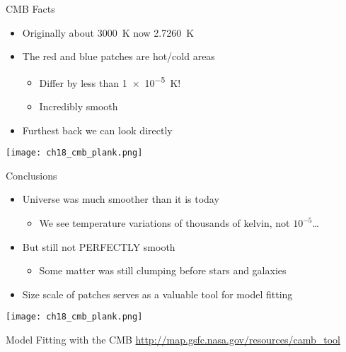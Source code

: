 \documentclass[pdf,aspectratio=169]{beamer}
\begin{document}
\begin{frame}{CMB Facts}
  \begin{itemize}
	\item Originally about \SI{3000}{\kelvin} now \SI{2.7260}{\kelvin}
	\item The red and blue patches are hot/cold areas
	  \begin{itemize}
		\item Differ by less than \SI{1e-5}{\kelvin}!
		\item Incredibly smooth
	  \end{itemize}
	\item Furthest back we can look directly
  \end{itemize}
  \begin{center}
	\texttt{[image: ch18\_cmb\_plank.png]}
  \end{center}
\end{frame}

\begin{frame}{Conclusions}
  \begin{itemize}
	\item Universe was much smoother than it is today
	  \begin{itemize}
		\item We see temperature variations of thousands of kelvin, not $10^{-5}$\ldots
	  \end{itemize}
	\item But still not PERFECTLY smooth
	  \begin{itemize}
		\item Some matter was still clumping before stars and galaxies
	  \end{itemize}
	\item Size scale of patches serves as a valuable tool for model fitting
  \end{itemize}
  \begin{center}
	\texttt{[image: ch18\_cmb\_plank.png]}
  \end{center}
\end{frame}

\begin{frame}{Model Fitting with the CMB}
  \url{http://map.gsfc.nasa.gov/resources/camb_tool}
\end{frame}
\end{document}
